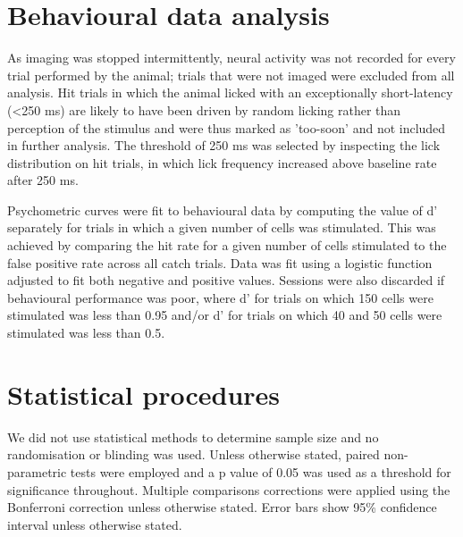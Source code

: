 \section{Behavioural data analysis}

As imaging was stopped intermittently, neural activity was not recorded for every trial performed by the animal; trials that were not imaged were excluded from all analysis. Hit trials in which the animal licked with an exceptionally short-latency (<250 ms) are likely to have been driven by random licking rather than perception of the stimulus and were thus marked as 'too-soon' and not included in further analysis. The threshold of 250 ms was selected by inspecting the lick distribution on hit trials, in which lick frequency increased above baseline rate after 250 ms. 

Psychometric curves were fit to behavioural data by computing the value of d’ separately for trials in which a given number of cells was stimulated. This was achieved by comparing the hit rate for a given number of cells stimulated to the false positive rate across all catch trials. Data was fit using a logistic function adjusted to fit both negative and positive values. Sessions were also discarded if behavioural performance was poor, where d' for trials on which 150 cells were stimulated was less than 0.95 and/or d' for trials on which 40 and 50 cells were stimulated was less than 0.5.

\section{Statistical procedures}
We did not use statistical methods to determine sample size and no randomisation or blinding was used. Unless otherwise stated, paired non-parametric tests were employed and a p value of 0.05 was used as a threshold for significance throughout. Multiple comparisons corrections were applied using the Bonferroni correction unless otherwise stated. Error bars show 95\% confidence interval unless otherwise stated.


